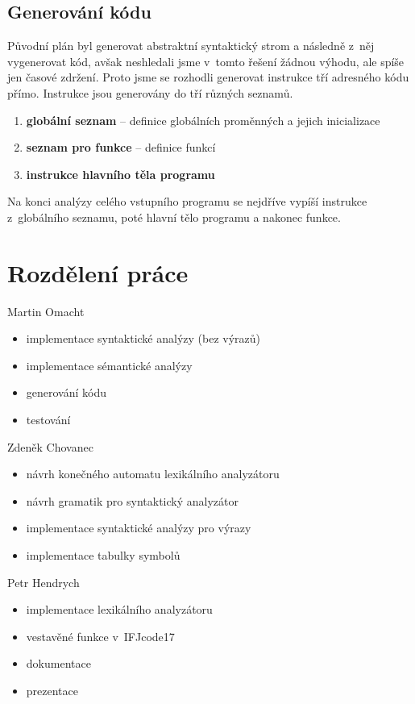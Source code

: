 \documentclass[a4paper,11pt,leqno]{article}
\begin{document}
\subsection{Generování kódu}
Původní plán byl generovat abstraktní syntaktický strom a následně z~něj
vygenerovat kód, avšak neshledali jsme v tomto řešení žádnou výhodu, ale spíše jen
časové zdržení. Proto jsme se rozhodli generovat instrukce tří adresného kódu přímo.
Instrukce jsou generovány do tří různých seznamů.
\begin{enumerate}
	\item{\textbf{globální seznam} -- definice globálních proměnných a jejich inicializace}
	\item{\textbf{seznam pro funkce} -- definice funkcí}
	\item{\textbf{instrukce hlavního těla programu}}
\end{enumerate}
Na konci analýzy celého vstupního programu se nejdříve vypíší instrukce z~globálního seznamu, poté hlavní tělo programu a nakonec funkce.
\section{Rozdělení práce}
Martin Omacht
\begin{itemize}
	\item{implementace syntaktické analýzy (bez výrazů)}
	\item{implementace sémantické analýzy}
	\item{generování kódu}
	\item{testování}
\end{itemize}
Zdeněk Chovanec
\begin{itemize}
	\item{návrh konečného automatu lexikálního analyzátoru}
	\item{návrh gramatik pro syntaktický analyzátor}
	\item{implementace syntaktické analýzy pro výrazy}
	\item{implementace tabulky symbolů}
\end{itemize}
Petr Hendrych
\begin{itemize}
	\item{implementace lexikálního analyzátoru}
	\item{vestavěné funkce v IFJcode17}
	\item{dokumentace}
	\item{prezentace}
\end{itemize}
\end{document}
